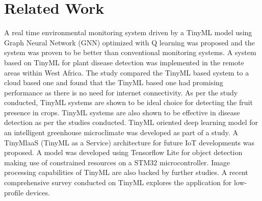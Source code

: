 \documentclass[fleqn,10pt]{wlscirep}
\begin{document}
\section*{Related Work}
\label{sec:relatedwork}




A real time environmental monitoring system driven by a TinyML model using Graph Neural Network (GNN) optimized with Q learning was proposed\cite{ieee00gnn}
and the system was proven to be better than conventional monitoring systems.
A system based on TinyML for plant disease detection was implemented in the remote areas within West Africa\cite{ieee01africa}. The
study compared the TinyML based system to a cloud based one and found that the TinyML based one had promising performance as
there is no need for internet connectivity.
As per the study\cite{ieee03} conducted, TinyML systems are shown to be ideal choice for detecting the fruit presence in crops.
TinyML systems are also shown to be effective in disease detection as per the studies\cite{sd00, ieee01africa} conducted.
TinyML oriented deep learning model for an intelligent greenhouse microclimate was developed as part of a study\cite{sp02}.
A TinyMlaaS (TinyML as a Service) architecture for future IoT developments was proposed\cite{ieee05}.
A model was developed using Tensorflow Lite for object detection making use of constrained resources on a STM32 microcontroller\cite{sd02}.
Image processing capabilities of TinyML are also backed by further studies\cite{sd03}.
A recent comprehensive survey\cite{ieee06} conducted on TinyML explores the application for low-profile devices.




% 

\end{document}
